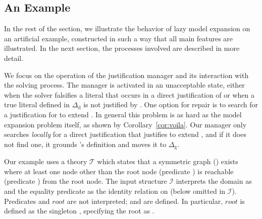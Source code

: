 \documentclass[11pt]{article}
\newcommand{\m}[1]{\ensuremath{#1}\xspace}
\newcommand{\I}{\m{\mathcal{I}}}
\newcommand{\theory}{\m{\mathcal{T}}}
\newcommand{\D}{\m{\Delta}}
\theoremstyle{plain}
\theoremstyle{definition}
\theoremstyle{example_basic}
\theoremstyle{example_contd}
\theoremstyle{plain}
\newcommand{\Dg}{\ensuremath{\D_\text{g}}\xspace}
\newcommand{\Dd}{\ensuremath{\D_\text{d}}\xspace}
\newcommand{\change}[1]{#1}
\begin{document}
\newcommand{\rt}{\ensuremath{root}}
\newcommand{\rtx}{\ensuremath{root}\xspace}

\subsection{An Example}\label{sec:lazyExample}

\change{In the rest of the section, we illustrate the behavior of lazy
  model expansion on an artificial example, constructed in such a way
  that all main features are illustrated. In the next section, the
  processes involved are described in more detail. }

\change{We focus on the operation of   the justification manager  and its interaction with the  solving process.  The  manager is activated in an unacceptable state, either when the solver falsifies a literal that occurs in a direct justification of \jgraph or when a true  literal   defined in \Dd is not justified by \jgraph. One option for repair is to search for a justification for  to extend \jgraph. In general this problem is as hard as the model expansion problem itself, as shown by Corollary~\ref{cor:voila}. Our manager only searches {\em locally} for a direct justification that justifies  to extend \jgraph, and if it does not find one, it grounds 's definition and moves it to \Dg.   }

Our example uses a theory \theory which states that a symmetric graph
() exists where at least one node other than the root node (predicate ) 
is reachable (predicate ) from the root node. 
The input structure \I
interprets the domain  as  \change{ and the equality predicate as the identity
  relation on  (below omitted in \I)}. Predicates   and \rtx are not interpreted;  and  are defined.  In particular, \rtx is defined as the singleton , specifying the root as .
\end{document}
